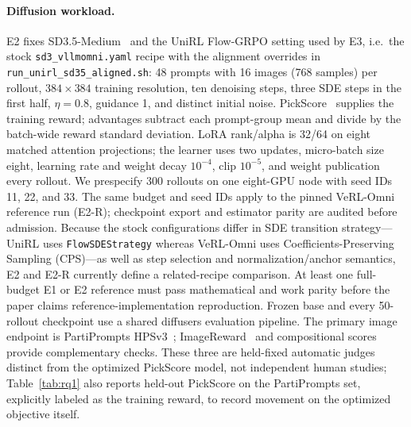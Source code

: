 \documentclass[10pt]{article}
\newcommand{\codepath}[1]{\texttt{#1}}
\begin{document}
\paragraph{Diffusion workload.}
E2 fixes SD3.5-Medium~\citep{sd35medium2024} and the UniRL Flow-GRPO setting used by E3, i.e.\ the stock \codepath{sd3\_vllmomni.yaml} recipe with the alignment overrides in \codepath{run\_unirl\_sd35\_aligned.sh}: 48 prompts with 16 images (768 samples) per rollout, $384\times384$ training resolution, ten denoising steps, three SDE steps in the first half, $\eta=0.8$, guidance 1, and distinct initial noise.
PickScore~\citep{kirstain2023pickapic} supplies the training reward; advantages subtract each prompt-group mean and divide by the batch-wide reward standard deviation.
LoRA rank/alpha is 32/64 on eight matched attention projections; the learner uses two updates, micro-batch size eight, learning rate and weight decay $10^{-4}$, clip $10^{-5}$, and weight publication every rollout.
We prespecify 300 rollouts on one eight-GPU node with seed IDs 11, 22, and 33.
The same budget and seed IDs apply to the pinned VeRL-Omni reference run (E2-R); checkpoint export and estimator parity are audited before admission.
Because the stock configurations differ in SDE transition strategy---UniRL uses \texttt{FlowSDEStrategy} whereas VeRL-Omni uses Coefficients-Preserving Sampling (CPS)---as well as step selection and normalization/anchor semantics, E2 and E2-R currently define a related-recipe comparison. At least one full-budget E1 or E2 reference must pass mathematical and work parity before the paper claims reference-implementation reproduction.
Frozen base and every 50-rollout checkpoint use a shared diffusers evaluation pipeline. The primary image endpoint is PartiPrompts HPSv3~\citep{ma2025hpsv3}; ImageReward~\citep{xu2023imagereward} and compositional scores provide complementary checks.
These three are held-fixed automatic judges distinct from the optimized PickScore model, not independent human studies; Table~\ref{tab:rq1} also reports held-out PickScore on the PartiPrompts set, explicitly labeled as the training reward, to record movement on the optimized objective itself.
\end{document}
